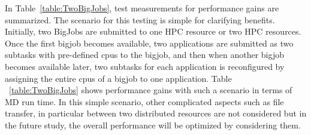\documentclass[conference,final]{IEEEtran}
\newcommand{\jhanote}[1]{ {\textcolor{red} { ***Jha: #1 }}}
\newcommand{\jhanote}[1]{}
\begin{document}
In Table~\ref{table:TwoBigJobs}, test measurements for performance gains are summarized. The scenario for this testing is simple for clarifying benefits.  Initially, two BigJobs are submitted to one HPC resource or two HPC resources.  Once the first bigjob becomes available, two applications are submitted as two subtasks with pre-defined cpus to the bigjob, and then when another bigjob becomes available later, two subtasks for each application is reconfigured by assigning the entire cpus of a bigjob to one application.  Table  ~\ref{table:TwoBigJobs} shows performance gains with such a scenario in terms of MD run time.  In this simple scenario, other complicated aspects such as file transfer, in particular between two distributed resources are not considered but in the future study, the overall performance will be optimized by considering them.

\end{document}
